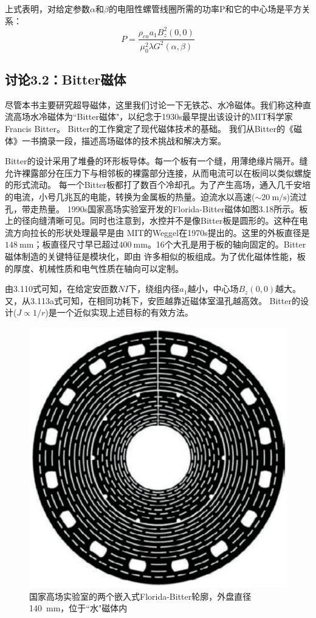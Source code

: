 上式表明，对给定参数$\alpha$和$\beta$的电阻性螺管线圈所需的功率P和它的中心场是平方关系：
\begin{equation*}
P=\frac{\rho_{cu}a_1B_z^2(0,0)}{\mu_0^2\lambda G^2(\alpha,\beta)}\tag{3.113c}%
\end{equation*}

\subsection{讨论3.2：Bitter磁体}
尽管本书主要研究超导磁体，这里我们讨论一下无铁芯、水冷磁体。我们称这种直流高场水冷磁体为``Bitter磁体"，以纪念于1930s最早提出该设计的MIT科学家Francis Bitter。
Bitter的工作奠定了现代磁体技术的基础。
我们从Bitter的《磁体》一书摘录一段，描述高场磁体的技术挑战和解决方案。


Bitter的设计采用了堆叠的环形板导体。每一个板有一个缝，用薄绝缘片隔开。缝允许裸露部分在压力下与相邻板的裸露部分连接，从而电流可以在板间以类似螺旋的形式流动。
每一个Bitter板都打了数百个冷却孔。为了产生高场，通入几千安培的电流，小号几兆瓦的电能，转换为金属板的热量。迫流水以高速($\sim 20\ \mathrm{m/s}$)流过孔，带走热量。
1990s国家高场实验室开发的Florida-Bitter磁体如图3.18所示。板上的径向缝清晰可见。同时也注意到，水控并不是像Bitter板是圆形的。这种在电流方向拉长的形状处理最早是由
MIT的Weggel在1970s提出的。这里的外板直径是$148\ \mathrm{mm}$；板直径尺寸早已超过$400\ \mathrm{mm}$。16个大孔是用于板的轴向固定的。Bitter磁体制造的关键特征是模块化，即由
许多相似的板组成。为了优化磁体性能，板的厚度、机械性质和电气性质在轴向可以定制。

由3.110式可知，在给定安匝数$NI$下，绕组内径$a_1$越小，中心场$B_z(0,0)$越大。又，从3.113a式可知，在相同功耗下，安匝越靠近磁体室温孔越高效。
Bitter的设计($J\propto 1/r$)是一个近似实现上述目标的有效方法。

\begin{figure}[htbp]
  \centering
 \includegraphics[scale=0.4]{chpt3/figs/fig3.18.eps}
  \caption{国家高场实验室的两个嵌入式Florida-Bitter轮廓，外盘直径140\ mm，位于``水"磁体内}
\end{figure}

